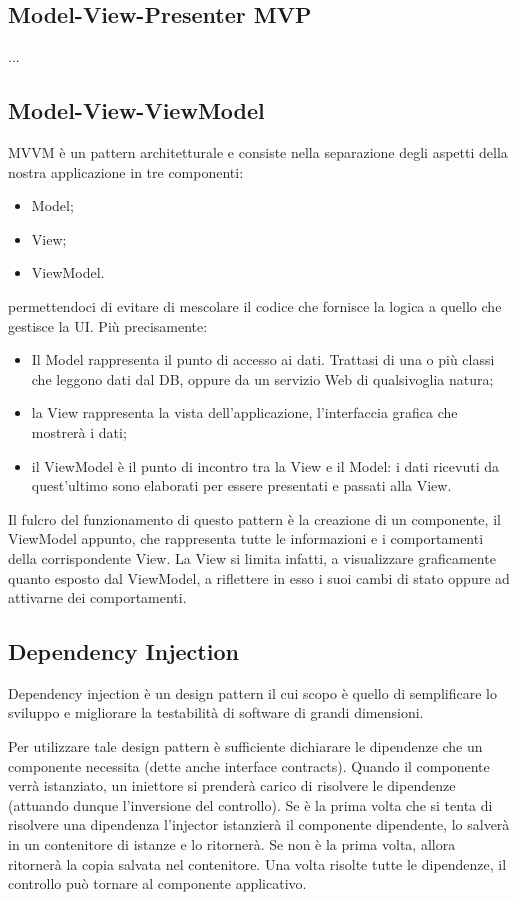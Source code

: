 \subsection{Model-View-Presenter MVP}
...

\subsection{Model-View-ViewModel}
MVVM è un pattern architetturale e consiste nella separazione degli aspetti della nostra applicazione in tre componenti:
\begin{itemize}
\item Model;
\item View;
\item ViewModel.
\end{itemize}
permettendoci di evitare di mescolare il codice che fornisce la logica a quello che gestisce la UI.
Più precisamente:
\begin{itemize}
	\item Il Model rappresenta il punto di accesso ai dati. Trattasi di una o più classi che leggono dati dal DB, oppure da un servizio Web di qualsivoglia natura;
	\item la View rappresenta la vista dell'applicazione, l'interfaccia grafica che mostrerà i dati;
	\item il ViewModel è il punto di incontro tra la View e il Model: i dati ricevuti da quest'ultimo sono elaborati per essere presentati e passati alla View.
\end{itemize}

Il fulcro del funzionamento di questo pattern è la creazione di un componente, il ViewModel appunto, che rappresenta tutte le informazioni e i comportamenti della corrispondente View. La View si limita infatti, a visualizzare graficamente quanto esposto dal ViewModel, a riflettere in esso i suoi cambi di stato oppure ad attivarne dei comportamenti.

\subsection{Dependency Injection}
Dependency injection è un design pattern il cui scopo è quello di semplificare lo sviluppo e migliorare la testabilità di software di grandi dimensioni.

Per utilizzare tale design pattern è sufficiente dichiarare le dipendenze che un componente necessita (dette anche interface contracts). Quando il componente verrà istanziato, un iniettore si prenderà carico di risolvere le dipendenze (attuando dunque l'inversione del controllo). Se è la prima volta che si tenta di risolvere una dipendenza l'injector istanzierà il componente dipendente, lo salverà in un contenitore di istanze e lo ritornerà. Se non è la prima volta, allora ritornerà la copia salvata nel contenitore. Una volta risolte tutte le dipendenze, il controllo può tornare al componente applicativo.

